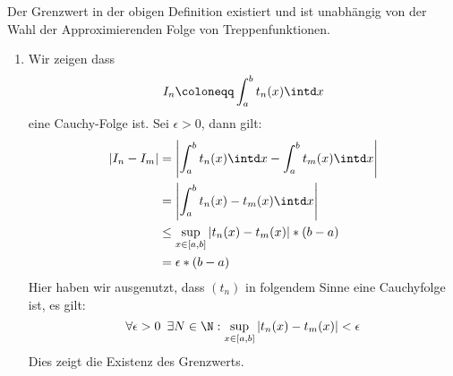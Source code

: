 \begin{lemma}{}
	Der Grenzwert in der obigen Definition existiert und ist unabhängig von der Wahl der Approximierenden Folge von Treppenfunktionen.
\end{lemma}

\begin{beweis}{}
	\begin{enumerate}
		\item Wir zeigen dass
		\begin{equation*}
			I_n\coloneqq \int_a^b t_n(x)\intd x
		\end{equation*}
		eine Cauchy-Folge ist. Sei $\epsilon>0$, dann gilt:
		\begin{align*}
			|I_n-I_m|&=\left|\int_a^b t_n(x)\intd x-\int_a^b t_m(x)\intd x\right|\\
			&=\left|\int_a^b t_n(x)-t_m(x)\intd x\right|\\
			&\leq \sup_{x\in[a,b]}|t_n(x)-t_m(x)|*(b-a)\\
			&=\epsilon*(b-a)
		\end{align*}
		Hier haben wir ausgenutzt, dass $(t_n)$ in folgendem Sinne eine Cauchyfolge ist, es gilt:
		\begin{equation*}
			\forall \epsilon>0 \enspace\exists N\in\N:\sup_{x\in[a,b]}|t_n(x)-t_m(x)|<\epsilon
		\end{equation*}
		Dies zeigt die Existenz des Grenzwerts.
	\end{enumerate}
\end{beweis}
